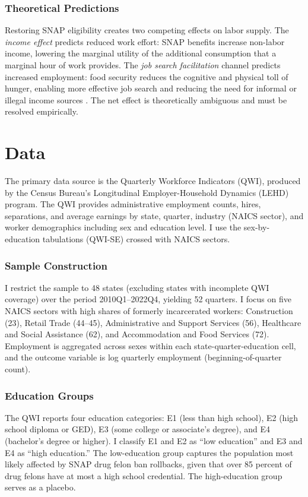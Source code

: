 \documentclass[12pt]{article}
\begin{document}
\subsubsection*{Theoretical Predictions} Restoring SNAP eligibility creates two competing effects on labor supply. The \textit{income effect} predicts reduced work effort: SNAP benefits increase non-labor income, lowering the marginal utility of the additional consumption that a marginal hour of work provides. The \textit{job search facilitation} channel predicts increased employment: food security reduces the cognitive and physical toll of hunger, enabling more effective job search and reducing the need for informal or illegal income sources \citep{tuttle2019snap}. The net effect is theoretically ambiguous and must be resolved empirically.

\section{Data}

The primary data source is the Quarterly Workforce Indicators (QWI), produced by the Census Bureau's Longitudinal Employer-Household Dynamics (LEHD) program. The QWI provides administrative employment counts, hires, separations, and average earnings by state, quarter, industry (NAICS sector), and worker demographics including sex and education level. I use the sex-by-education tabulations (QWI-SE) crossed with NAICS sectors.

\subsubsection*{Sample Construction} I restrict the sample to 48 states (excluding states with incomplete QWI coverage) over the period 2010Q1--2022Q4, yielding 52 quarters. I focus on five NAICS sectors with high shares of formerly incarcerated workers: Construction (23), Retail Trade (44--45), Administrative and Support Services (56), Healthcare and Social Assistance (62), and Accommodation and Food Services (72). Employment is aggregated across sexes within each state-quarter-education cell, and the outcome variable is log quarterly employment (beginning-of-quarter count).

\subsubsection*{Education Groups} The QWI reports four education categories: E1 (less than high school), E2 (high school diploma or GED), E3 (some college or associate's degree), and E4 (bachelor's degree or higher). I classify E1 and E2 as ``low education'' and E3 and E4 as ``high education.'' The low-education group captures the population most likely affected by SNAP drug felon ban rollbacks, given that over 85 percent of drug felons have at most a high school credential. The high-education group serves as a placebo.
\end{document}
